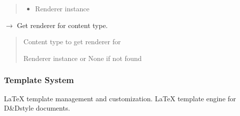 \documentclass[letterpaper,10pt,english]{sphinxmanual}
\begin{document}
\begin{fulllineitems}
\begin{fulllineitems}
\begin{quote}
\begin{description}
\begin{itemize}
\item {} 
\sphinxAtStartPar
{} \textendash{} Renderer instance

\end{itemize}

\end{description}\end{quote}

\end{fulllineitems}


\begin{fulllineitems}
\label{\detokenize{api/renderers:src.renderers.latex.content.LaTeXContentRendererRegistry.get_renderer}}
\pysigstartsignatures
\pysiglinewithargsret
{}
{}
{{ $\rightarrow$ {\hyperref[\detokenize{api/renderers:src.renderers.base.content.ContentRenderer}]{}}}}
\pysigstopsignatures
\sphinxAtStartPar
Get renderer for content type.
\begin{quote}\begin{description}
\sphinxAtStartPar
{} \textendash{} Content type to get renderer for

\sphinxAtStartPar
Renderer instance or None if not found

\end{description}\end{quote}

\end{fulllineitems}


\end{fulllineitems}



\subsubsection{Template System}
\label{\detokenize{api/renderers:template-system}}
\sphinxAtStartPar
LaTeX template management and customization.
\label{\detokenize{api/renderers:module-src.renderers.latex.templates}}
\sphinxAtStartPar
LaTeX template engine for D\&D\sphinxhyphen{}style documents.
\end{document}
